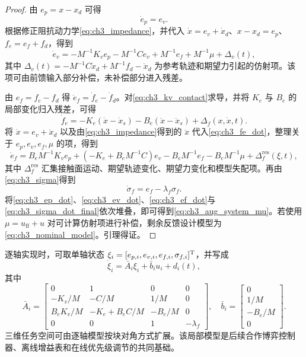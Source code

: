 \begin{proof}
由 $e_p=x-x_d$ 可得
\begin{equation}
  \dot e_p=e_v .
  \label{eq:ch3_ep_dot}
\end{equation}
根据修正阻抗动力学\eqref{eq:ch3_impedance}，并代入 $\dot x=e_v+\dot x_d$、$x-x_d=e_p$、$f_e=e_f+f_d$，得到
\begin{equation}
  \dot e_v=-M^{-1}K_ve_p-M^{-1}Ce_v+M^{-1}e_f+M^{-1}\mu+\Delta_v(t),
  \label{eq:ch3_ev_dot}
\end{equation}
其中 $\Delta_v(t)=-M^{-1}C\dot x_d+M^{-1}f_d-\ddot x_d$ 为参考轨迹和期望力引起的仿射项。该项可由前馈输入部分补偿，未补偿部分进入残差。

由 $e_f=f_e-f_d$ 得 $\dot e_f=\dot f_e-\dot f_d$。对\eqref{eq:ch3_kv_contact}求导，并将 $K_e$ 与 $B_e$ 的局部变化归入残差，可得
\begin{equation}
  \dot f_e=-K_e(\dot x-\dot x_s)-B_e(\ddot x-\ddot x_s)+\Delta_{\dot f}(x,\dot x,t).
  \label{eq:ch3_fe_dot}
\end{equation}
将 $\dot x=e_v+\dot x_d$ 以及由\eqref{eq:ch3_impedance}得到的 $\ddot x$ 代入\eqref{eq:ch3_fe_dot}，整理关于 $e_p,e_v,e_f,\mu$ 的项，得到
\begin{equation}
  \dot e_f=B_eM^{-1}K_ve_p+(-K_e+B_eM^{-1}C)e_v-B_eM^{-1}e_f-B_eM^{-1}\mu+\Delta_f^{\mathrm{res}}(\xi,t),
  \label{eq:ch3_ef_dot}
\end{equation}
其中 $\Delta_f^{\mathrm{res}}$ 汇集接触面运动、期望轨迹变化、期望力变化和模型失配项。再由\eqref{eq:ch3_sigma}得到
\begin{equation}
  \dot\sigma_f=e_f-\lambda_f\sigma_f .
  \label{eq:ch3_sigma_dot_final}
\end{equation}
将\eqref{eq:ch3_ep_dot}、\eqref{eq:ch3_ev_dot}、\eqref{eq:ch3_ef_dot}与\eqref{eq:ch3_sigma_dot_final}依次堆叠，即可得到\eqref{eq:ch3_aug_system_mu}。若使用 $\mu=u_{\mathrm{ff}}+u$ 对可计算仿射项进行补偿，剩余反馈设计模型为\eqref{eq:ch3_nominal_model}。引理得证。
\end{proof}

逐轴实现时，可取单轴状态 $\xi_i=[e_{p,i},e_{v,i},e_{f,i},\sigma_{f,i}]^{\mathrm{T}}$，并写成
\begin{equation}
  \dot\xi_i=\bar A_i\xi_i+\bar b_i u_i+d_i(t),
  \label{eq:ch3_axis_state}
\end{equation}
其中
\begin{equation}
  \bar A_i=\begin{bmatrix}
  0&1&0&0\\
  -K_v/M&-C/M&1/M&0\\
  B_eK_v/M&-K_e+B_eC/M&-B_e/M&0\\
  0&0&1&-\lambda_f
  \end{bmatrix},
  \quad
  \bar b_i=\begin{bmatrix}0\\1/M\\-B_e/M\\0\end{bmatrix}.
  \label{eq:ch3_axis_matrices}
\end{equation}
三维任务空间可由逐轴模型按块对角方式扩展。该局部模型是后续合作博弈控制器、离线增益表和在线优先级调节的共同基础。

